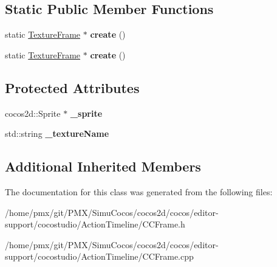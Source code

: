 \subsection*{Static Public Member Functions}
\begin{DoxyCompactItemize}
\item 
\mbox{\label{classTextureFrame_ad4a2ad780e7534d7c2482bb535f33586}} 
static \hyperlink{classTextureFrame}{Texture\+Frame} $\ast$ {\bfseries create} ()
\item 
\mbox{\label{classTextureFrame_a00a1858e7a75f0a88b897370c26b0686}} 
static \hyperlink{classTextureFrame}{Texture\+Frame} $\ast$ {\bfseries create} ()
\end{DoxyCompactItemize}
\subsection*{Protected Attributes}
\begin{DoxyCompactItemize}
\item 
\mbox{\label{classTextureFrame_a4199b412ba6c2861ea0544ce6460d3a4}} 
cocos2d\+::\+Sprite $\ast$ {\bfseries \+\_\+sprite}
\item 
\mbox{\label{classTextureFrame_a3530b11fb32b3ef152e0a552f8375cc2}} 
std\+::string {\bfseries \+\_\+texture\+Name}
\end{DoxyCompactItemize}
\subsection*{Additional Inherited Members}


The documentation for this class was generated from the following files\+:\begin{DoxyCompactItemize}
\item 
/home/pmx/git/\+P\+M\+X/\+Simu\+Cocos/cocos2d/cocos/editor-\/support/cocostudio/\+Action\+Timeline/C\+C\+Frame.\+h\item 
/home/pmx/git/\+P\+M\+X/\+Simu\+Cocos/cocos2d/cocos/editor-\/support/cocostudio/\+Action\+Timeline/C\+C\+Frame.\+cpp\end{DoxyCompactItemize}
